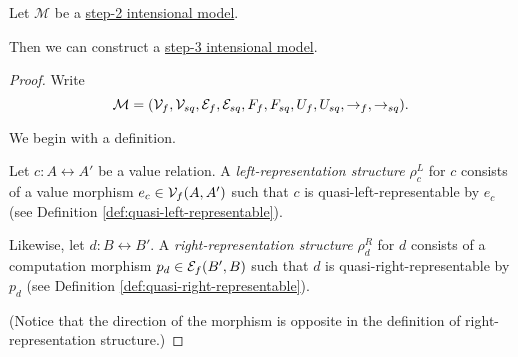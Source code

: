 \begin{lemma}\label{lem:step-2-model-to-step-3-model}
  Let $\mathcal M$ be a \hyperref[def:step-2-model]{step-2 intensional model}.

  Then we can construct a \hyperref[def:step-3-model]{step-3 intensional model}.
\end{lemma}
\begin{proof}
  Write 
  \[ \mathcal M = (\mathcal{V}_f, \mathcal{V}_{sq}, \mathcal{E}_f, \mathcal{E}_{sq}, F_f, F_{sq}, U_f, U_{sq}, \to_f, \to_{sq}). \] 

  We begin with a definition.

  \begin{definition}
  Let $c : A \rel A'$ be a value relation. A \emph{left-representation structure} $\rho^L_c$ for $c$ consists of
  a value morphism $e_c \in \mathcal{V}_f(A, A')$ such that $c$ is quasi-left-representable by $e_c$ (see Definition \ref{def:quasi-left-representable}).
  
  Likewise, let $d : B \rel B'$. A \emph{right-representation structure} $\rho^R_d$ for $d$ consists of
  a computation morphism $p_d \in \mathcal{E}_f(B', B)$ such that $d$ is quasi-right-representable by $p_d$ (see Definition \ref{def:quasi-right-representable}).
  \end{definition}
  
  (Notice that the direction of the morphism is opposite in the definition of right-representation structure.)


\end{proof}
